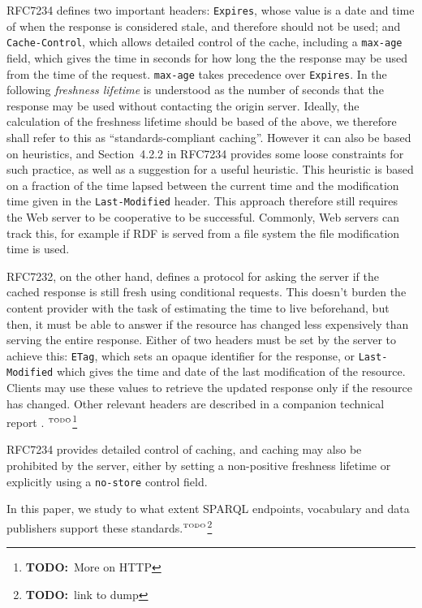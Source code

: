 \documentclass{llncs}
\newcommand{\httph}[1]{\texttt{#1}}
\newcommand{\todo}[1]{\ensuremath{^{\textrm{\tiny{TODO}\normalsize}}}\footnote{\textbf{TODO:}~#1}}
\begin{document}
RFC7234 defines two important headers: \httph{Expires}, whose value is
a date and time of when the response is considered stale, and
therefore should not be used; and \httph{Cache-Control}, which allows
detailed control of the cache, including a \httph{max-age} field,
which gives the time in seconds for how long the the response may be
used from the time of the request. \httph{max-age} takes precedence
over \httph{Expires}. In the following \emph{freshness lifetime} is
understood as the number of seconds that the response may be used
without contacting the origin server. Ideally, the calculation of the
freshness lifetime should be based of the above, we therefore shall
refer to this as ``standards-compliant caching''. However it can also
be based on heuristics, and Section~4.2.2 in RFC7234 provides some loose
constraints for such practice, as well as a suggestion for a useful
heuristic. This heuristic is based on a fraction of the time lapsed
between the current time and the modification time given in the
\httph{Last-Modified} header. This approach therefore still requires
the Web server to be cooperative to be successful. Commonly, Web
servers can track this, for example if RDF is served from a file
system the file modification time is used.

RFC7232, on the other hand, defines a protocol for asking the server
if the cached response is still fresh using conditional requests. This
doesn't burden the content provider with the task of estimating the
time to live beforehand, but then, it must be able to answer if the
resource has changed less expensively than serving the entire
response. Either of two headers must be set by the server to achieve
this: \httph{ETag}, which sets an opaque identifier for the response,
or \httph{Last-Modified} which gives the time and date of the last
modification of the resource. Clients may use these values to retrieve
the updated response only if the resource has changed. Other relevant
headers are described in a companion technical report
\cite{kjernsmo_add_survey_2015}.
\todo{More on HTTP}

RFC7234 provides detailed control of caching, and caching may also be
prohibited by the server, either by setting a non-positive freshness
lifetime or explicitly using a \httph{no-store} control field.

In this paper, we study to what extent SPARQL endpoints, vocabulary
and data publishers support these standards.\todo{link to dump}
\end{document}
